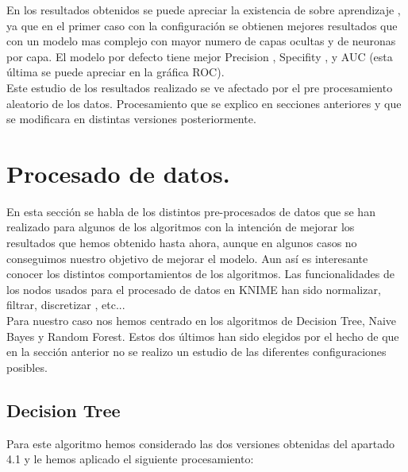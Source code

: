 	En los resultados obtenidos se puede apreciar la existencia de sobre aprendizaje , ya que en el primer caso con la configuración se obtienen mejores resultados que con un modelo mas complejo con mayor numero de capas  ocultas y de neuronas por capa. El modelo por defecto tiene mejor Precision , Specifity , y AUC (esta última se puede apreciar en la gráfica ROC). \\
	
	Este estudio de los resultados realizado se ve afectado por el pre procesamiento aleatorio de los datos. Procesamiento que se explico en secciones anteriores y que se modificara en distintas versiones posteriormente.

	\section[Procesado de datos]{Procesado de datos.}	
	
	En esta sección se habla de los distintos pre-procesados de datos que se han realizado para algunos de los algoritmos con la intención de mejorar los resultados que hemos obtenido hasta ahora, aunque en algunos casos no conseguimos nuestro objetivo de mejorar el modelo. Aun así es interesante conocer los distintos comportamientos de los algoritmos. Las funcionalidades de los nodos usados para el procesado de datos en KNIME han sido normalizar, filtrar, discretizar , etc... \\
	
	Para nuestro caso nos hemos centrado en los algoritmos de Decision Tree, Naive Bayes y Random Forest. Estos dos últimos han sido elegidos por el hecho de que en la sección anterior no se realizo un estudio de las diferentes configuraciones posibles. 
	
	
	\subsection{Decision Tree}
	
	Para este algoritmo hemos considerado las dos versiones obtenidas del apartado 4.1 y le hemos aplicado el siguiente procesamiento:\\
	
